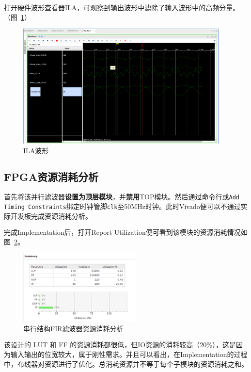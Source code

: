 打开硬件波形查看器ILA，可观察到输出波形中滤除了输入波形中的高频分量。（图~\ref{fig:exp6:sim:ILA}）
\begin{figure}[htbp]
  \centering
  \includegraphics[width = 0.95\textwidth]{figure/exp6/ILA.png}
  \caption{ILA波形}
  \label{fig:exp6:sim:ILA}
\end{figure}
\subsection{FPGA资源消耗分析}
首先将该并行滤波器\textbf{设置为顶层模块}，并\textbf{禁用}TOP模块。然后通过命令行或\texttt{Add Timing Constraints}绑定时钟管脚\texttt{clk}至50MHz时钟。此时Vivado便可以不通过实际开发板完成资源消耗分析。

完成Implementation后，打开Report Utilization便可看到该模块的资源消耗情况如图~\ref{fig:exp6:util}。
\begin{figure}[htbp]
  \centering
  \includegraphics[width=0.55\textwidth]{figure/exp6/util_summary.png}
  \caption{串行结构FIR滤波器资源消耗分析}
  \label{fig:exp6:util}
\end{figure}

该设计的 LUT 和 FF 的资源消耗都很低，但IO资源的消耗较高（20\%），这是因为输入输出的位宽较大，属于刚性需求。并且可以看出，在Implementation的过程中，布线器对资源进行了优化。总消耗资源并不等于每个子模块的资源消耗之和。

